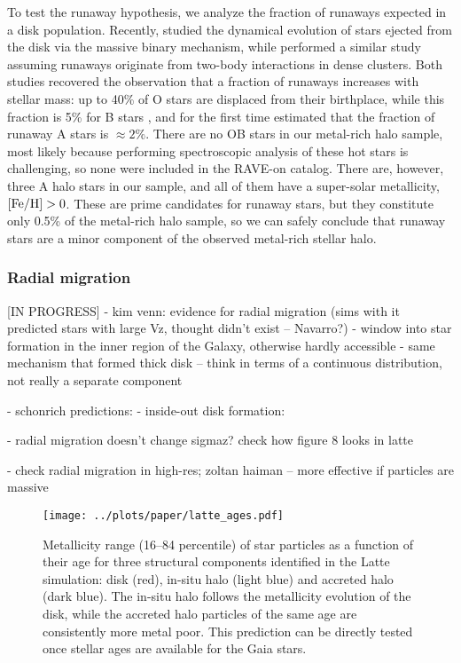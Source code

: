 \documentclass[apj, twocolappendix, numberedappendix, appendixfloats]{emulateapj}
\begin{document}
To test the runaway hypothesis, we analyze the fraction of runaways expected in a disk population.
Recently, \citet{bromley2009} studied the dynamical evolution of stars ejected from the disk via the massive binary mechanism, while \citet{perets2012} performed a similar study assuming runaways originate from two-body interactions in dense clusters.
Both studies recovered the observation that a fraction of runaways increases with stellar mass: up to 40\% of O stars are displaced from their birthplace, while this fraction is 5\% for B stars \citep{blaauw1961, gies1986}, and for the first time estimated that the fraction of runaway A stars is $\approx2\%$.
There are no OB stars in our metal-rich halo sample, most likely because performing spectroscopic analysis of these hot stars is challenging, so none were included in the RAVE-on catalog.
There are, however, three A halo stars in our sample, and all of them have a super-solar metallicity, $\rm[Fe/H]>0$.
These are prime candidates for runaway stars, but they constitute only 0.5\% of the metal-rich halo sample, so we can safely conclude that runaway stars are a minor component of the observed metal-rich stellar halo.

\subsubsection{Radial migration}
\label{sec:migration}
[IN PROGRESS]
- kim venn: evidence for radial migration (sims with it predicted stars with large Vz, thought didn't exist -- Navarro?)
- window into star formation in the inner region of the Galaxy, otherwise hardly accessible
- same mechanism that formed thick disk -- think in terms of a continuous distribution, not really a separate component

- schonrich predictions: %
- inside-out disk formation: %

- radial migration doesn't change sigmaz? check how figure 8 looks in latte %

- check radial migration in high-res; zoltan haiman -- more effective if particles are massive


\begin{figure}
\begin{center}
\texttt{[image: ../plots/paper/latte\_ages.pdf]}
\caption{Metallicity range (16--84 percentile) of star particles as a function of their age for three structural components identified in the Latte simulation: disk (red), in-situ halo (light blue) and accreted halo (dark blue).
The in-situ halo follows the metallicity evolution of the disk, while the accreted halo particles of the same age are consistently more metal poor.
This prediction can be directly tested once stellar ages are available for the Gaia stars.}
\label{fig:ages}
\end{center}
\end{figure}
\end{document}
